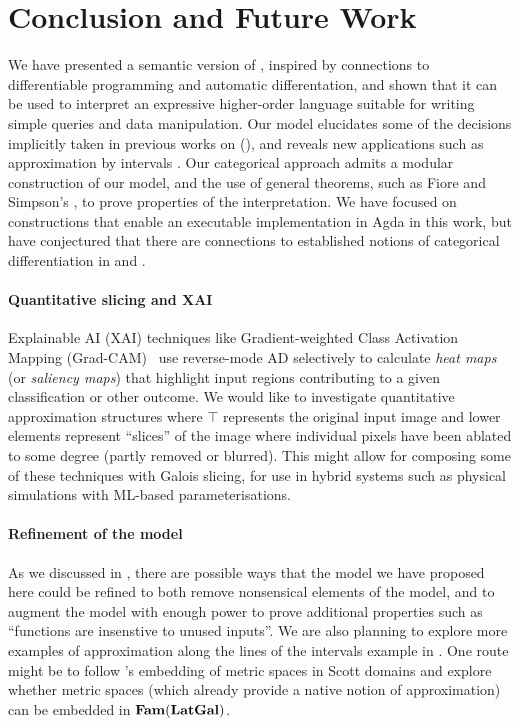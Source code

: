 \section{Conclusion and Future Work}
\label{sec:conclusion}

We have presented a semantic version of \GPS, inspired by connections to differentiable programming and
automatic differentation, and shown that it can be used to interpret an expressive higher-order language
suitable for writing simple queries and data manipulation. Our model elucidates some of the decisions
implicitly taken in previous works on \GPS (), and reveals new applications such as
approximation by intervals . Our categorical approach admits a modular construction of
our model, and the use of general theorems, such as Fiore and Simpson's , to prove
properties of the interpretation. We have focused on constructions that enable an executable implementation in
Agda in this work, but have conjectured that there are connections to established notions of categorical
differentiation in  and .

\paragraph{Quantitative slicing and XAI}  Explainable AI (XAI) techniques like Gradient-weighted Class
Activation Mapping (Grad-CAM)~\cite{selvaraju20} use reverse-mode AD selectively to calculate \emph{heat maps}
(or \emph{saliency maps}) that highlight input regions contributing to a given classification or other
outcome. We would like to investigate quantitative approximation structures where $\top$ represents the
original input image and lower elements represent ``slices'' of the image where individual pixels have been
ablated to some degree (partly removed or blurred). This might allow for composing some of these techniques
with Galois slicing, for use in hybrid systems such as physical simulations with ML-based parameterisations.

\paragraph{Refinement of the model} As we discussed in , there are possible ways
that the model we have proposed here could be refined to both remove nonsensical elements of the model, and to
augment the model with enough power to prove additional properties such as ``functions are insenstive to
unused inputs''. We are also planning to explore more examples of approximation along the lines of the
intervals example in . One route might be to follow \citet{edalat-heckmann98}'s
embedding of metric spaces in Scott domains and explore whether metric spaces (which already provide a native
notion of approximation) can be embedded in $\mathbf{Fam}(\mathbf{LatGal})$.

